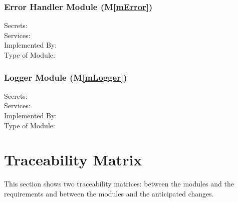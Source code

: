 \documentclass[12pt, titlepage]{article}
\newcommand{\mref}[1]{M\ref{#1}}
\begin{document}
\subsubsection{Error Handler Module (\mref{mError})}

\begin{description}
\item[Secrets:]
\item[Services:]
\item[Implemented By:] \progname
\item[Type of Module:]
\end{description}

\subsubsection{Logger Module (\mref{mLogger})}

\begin{description}
\item[Secrets:]
\item[Services:]
\item[Implemented By:] \progname
\item[Type of Module:]
\end{description}

\section{Traceability Matrix} \label{SecTM}

This section shows two traceability matrices: between the modules and the
requirements and between the modules and the anticipated changes.
\end{document}
